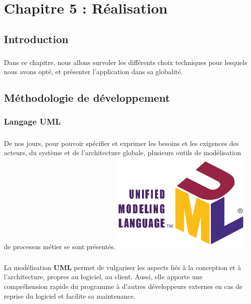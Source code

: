 \chapter{Chapitre 5 : Réalisation}

\section*{Introduction}
{}

\paragraph{}\begin{spacing}{2}
Dans ce chapitre, nous allons survoler les différents choix techniques pour lesquels nous avons opté, et présenter l’application dans sa globalité.
\end{spacing}
\vspace{4cm} 

\newpage
\section{Méthodologie de développement}
\subsection{Langage UML}
\paragraph{}
De nos jours, pour pouvoir spécifier et exprimer les besoins et les exigences des acteurs, du système et de l’architecture globale, plusieurs outils de modélisation de processus métier se sont présentés.
\includegraphics[width=\linewidth, height=5cm]{images/UML_logo.svg.png}

\paragraph{}
La modélisation \textbf{UML} permet de vulgariser les aspects liés à la conception et à l’architecture, propres au logiciel, au client. Aussi, elle apporte une compréhension rapide du programme à d’autres développeurs externes en cas de reprise du logiciel et facilite sa maintenance.
